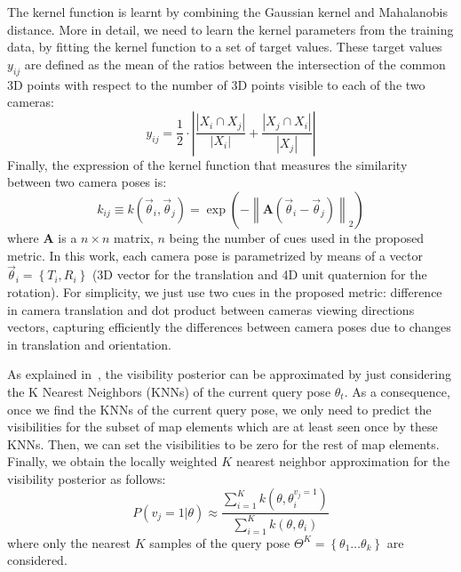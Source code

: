 The kernel function is learnt by combining the Gaussian kernel and Mahalanobis distance. More
in detail, we need to learn the kernel parameters from the training data, by fitting the kernel function to a set of target values. These target values $y_{ij}$ are defined as the mean of the ratios between the intersection of the common 3D points with respect to the number of 3D points visible to each of the two cameras:
%
\begin{equation}\label{eq:similarity_weighted}
y_{ij} = \frac{1}{2}\cdot \left| \frac{\left|X_i \cap X_j \right|}{\left|X_i\right|} + \frac{\left|X_j \cap X_i\right|}{\left|X_j\right|} \right|
\end{equation}
%
Finally, the expression of the kernel function that measures the similarity between two camera poses is:
%
\begin{equation}\label{eq:visibility_metric}
 k_{ij} \equiv k(\vec{\theta}_i,\vec{\theta}_j) =\exp\left(-\left\| \mathbf{A}(\vec{\theta}_i-\vec{\theta}_j)\right\|_{2}\right)
\end{equation}
%
where $\mathbf{A}$ is a $n \times n$ matrix, $n$ being the number of cues used in the proposed metric. In this work, each camera pose is parametrized by means of a vector $\vec{\theta}_i = \left\{T_{i},R_{i}\right\}$ (3D vector for the translation and 4D unit quaternion for the rotation). For simplicity, we just use two cues in the proposed metric: difference in camera translation and dot product
between cameras viewing directions vectors, capturing efficiently the differences between camera poses due to changes in translation and orientation.

As explained in~\cite{Alcantarilla11icra}, the visibility posterior can be approximated by just considering the K Nearest Neighbors (KNNs) of the current query pose $\theta_{t}$. As a consequence, once we find the KNNs of the current query pose, we only need to predict the visibilities for the subset of map elements which are at least seen once by these KNNs. Then, we can set the visibilities to be zero for
the rest of map elements. Finally, we obtain the locally weighted $K$ nearest neighbor approximation for the visibility posterior as follows:
%
\begin{equation} \label{eq:KNNVisibility}
P(v_{j}=1|\theta) \approx \frac{\sum\limits_{i=1}^{K}k(\theta,\theta_{i}^{v_{j}=1})}{\sum\limits_{i=1}^{K}k(\theta,\theta_{i})}
\end{equation}
%
where only the nearest $K$ samples of the query pose $\Theta^{K}=\left\{\theta_{1} \ldots \theta_{k}\right\}$ are considered.

